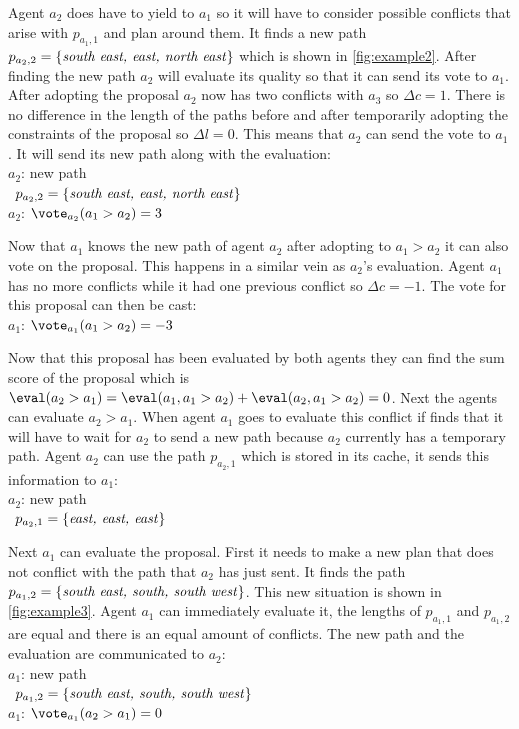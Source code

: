 \noindent Agent $a_2$ does have to yield to $a_1$ so it will have to consider 
possible 
conflicts that arise with $p_{a_1,1}$ and plan around them. It finds a new path 
$p_{a_2,2} = \{\text{\emph{south east, east, north east}}\}$ which is shown in 
\autoref{fig:example2}. After finding the new path $a_2$ will evaluate its 
quality so that it can send its vote to $a_1$. After adopting the proposal 
$a_2$ now has two conflicts with $a_3$ so $\Delta c = 1$. There is no 
difference in the length of the paths before and after temporarily adopting the 
constraints of the proposal so $\Delta l = 0$. This means that $a_2$ can send 
the vote to $a_1$. It will send its new path along with the evaluation:
\\ \-\qquad $a_2$: new path
\\ \-\qquad\quad\,\; $p_{a_2,2} = \{\text{\emph{south east, east, north 
east}}\}$
\\ \-\qquad $a_2$: $\vote_{a_2}(a_1 > a_2) = 3$

\noindent Now that $a_1$ knows the new path of agent $a_2$ after adopting to 
$a_1 > a_2$
it can also vote on the proposal. This happens in a similar vein as $a_2$'s
evaluation. Agent $a_1$ has no more conflicts while it had one previous 
conflict so $\Delta c = -1$. The vote for this proposal can then be cast:
\\ \-\qquad $a_1$: $\vote_{a_1}(a_1 > a_2) = -3$

\noindent Now that this proposal has been evaluated by both agents they can 
find the sum
score of the proposal which is $\eval(a_2 > a_1) = \eval(a_1, a_1 > a_2) +
\eval(a_2, a_1 > a_2) = 0$. Next the agents can evaluate $a_2 > a_1$. When 
agent $a_1$ goes to evaluate this conflict if finds that it will have to wait 
for $a_2$ to send a new path because $a_2$ currently has a temporary path. 
Agent $a_2$ can use the path $p_{a_2,1}$ which is stored in its cache, it sends 
this information to $a_1$:
\\ \-\qquad $a_2$: new path
\\ \-\qquad\quad\,\; $p_{a_2,1} = \{\text{\emph{east, east, east}}\}$

\noindent Next $a_1$ can evaluate the proposal. First it needs to make a new 
plan that 
does not conflict with the path that $a_2$ has just sent. It finds the path 
$p_{a_1,2} = \{\text{\emph{south east, south, south west}}\}$. This new 
situation is shown in \autoref{fig:example3}. Agent $a_1$ can immediately 
evaluate it, the lengths of $p_{a_1,1}$ and $p_{a_1,2}$ are equal and there is 
an equal amount of conflicts. The new path and the evaluation are communicated 
to $a_2$:
\\ \-\qquad $a_1$: new path
\\ \-\qquad\quad\,\; $p_{a_1,2} = \{\text{\emph{south east, south, south 
west}}\}$
\\ \-\qquad $a_1$: $\vote_{a_1}(a_2 > a_1) = 0$

